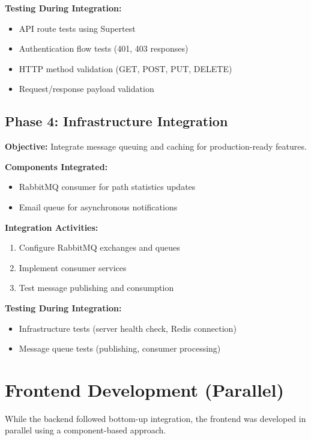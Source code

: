 \textbf{Testing During Integration:}
\begin{itemize}
    \item API route tests using Supertest
    \item Authentication flow tests (401, 403 responses)
    \item HTTP method validation (GET, POST, PUT, DELETE)
    \item Request/response payload validation
\end{itemize}

\subsection{Phase 4: Infrastructure Integration}
\label{subsec:phase4_infrastructure}

\textbf{Objective:} Integrate message queuing and caching for production-ready features.

\textbf{Components Integrated:}
\begin{itemize}
    \item RabbitMQ consumer for path statistics updates
    \item Email queue for asynchronous notifications
\end{itemize}

\textbf{Integration Activities:}
\begin{enumerate}
    \item Configure RabbitMQ exchanges and queues
    \item Implement consumer services
    \item Test message publishing and consumption
\end{enumerate}

\textbf{Testing During Integration:}
\begin{itemize}
    \item Infrastructure tests (server health check, Redis connection)
    \item Message queue tests (publishing, consumer processing)
\end{itemize}

\section{Frontend Development (Parallel)}
\label{sec:frontend_development}

While the backend followed bottom-up integration, the frontend was developed in parallel using a component-based approach.

